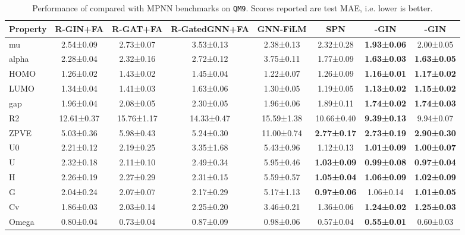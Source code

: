\documentclass{article}
\theoremstyle{plain}
\theoremstyle{definition}
\theoremstyle{remark}
\begin{document}
\begin{table*}[h]
\caption{Performance of  compared with MPNN benchmarks on \texttt{QM9}. Scores reported are test MAE, i.e. lower is better.}
\label{tab:qm9}
\begin{tabular}{@{}lccccccc@{}}
\toprule
Property & R-GIN+FA         & R-GAT+FA         & R-GatedGNN+FA    & GNN-FiLM         & SPN                      & -GIN           & -GIN    \\ \midrule
mu       & 2.54\small±0.09  & 2.73\small±0.07  & 3.53\small±0.13  & 2.38\small±0.13  & 2.32\small±0.28          & \textbf{1.93\small±0.06} & 2.00\small±0.05          \\
alpha    & 2.28\small±0.04  & 2.32\small±0.16  & 2.72\small±0.12  & 3.75\small±0.11  & 1.77\small±0.09          & \textbf{1.63\small±0.03} & \textbf{1.63\small±0.05} \\
HOMO     & 1.26\small±0.02  & 1.43\small±0.02  & 1.45\small±0.04  & 1.22\small±0.07  & 1.26\small±0.09          & \textbf{1.16\small±0.01} & \textbf{1.17\small±0.02} \\
LUMO     & 1.34\small±0.04  & 1.41\small±0.03  & 1.63\small±0.06  & 1.30\small±0.05  & 1.19\small±0.05          & \textbf{1.13\small±0.02} & \textbf{1.15\small±0.02} \\
gap      & 1.96\small±0.04  & 2.08\small±0.05  & 2.30\small±0.05  & 1.96\small±0.06  & 1.89\small±0.11          & \textbf{1.74\small±0.02} & \textbf{1.74\small±0.03} \\
R2       & 12.61\small±0.37 & 15.76\small±1.17 & 14.33\small±0.47 & 15.59\small±1.38 & 10.66\small±0.40         & \textbf{9.39\small±0.13} & 9.94\small±0.07          \\
ZPVE     & 5.03\small±0.36  & 5.98\small±0.43  & 5.24\small±0.30  & 11.00\small±0.74 & \textbf{2.77\small±0.17} & \textbf{2.73\small±0.19} & \textbf{2.90\small±0.30} \\
U0       & 2.21\small±0.12  & 2.19\small±0.25  & 3.35\small±1.68  & 5.43\small±0.96  & 1.12\small±0.13          & \textbf{1.01\small±0.09} & \textbf{1.00\small±0.07} \\
U        & 2.32\small±0.18  & 2.11\small±0.10  & 2.49\small±0.34  & 5.95\small±0.46  & \textbf{1.03\small±0.09} & \textbf{0.99\small±0.08} & \textbf{0.97\small±0.04} \\
H        & 2.26\small±0.19  & 2.27\small±0.29  & 2.31\small±0.15  & 5.59\small±0.57  & \textbf{1.05\small±0.04} & \textbf{1.06\small±0.09} & \textbf{1.02\small±0.09} \\
G        & 2.04\small±0.24  & 2.07\small±0.07  & 2.17\small±0.29  & 5.17\small±1.13  & \textbf{0.97\small±0.06} & 1.06\small±0.14          & \textbf{1.01\small±0.05} \\
Cv       & 1.86\small±0.03  & 2.03\small±0.14  & 2.25\small±0.20  & 3.46\small±0.21  & 1.36\small±0.06          & \textbf{1.24\small±0.02} & \textbf{1.25\small±0.03} \\
Omega    & 0.80\small±0.04  & 0.73\small±0.04  & 0.87\small±0.09  & 0.98\small±0.06  & 0.57\small±0.04          & \textbf{0.55\small±0.01} & 0.60\small±0.03          \\ \bottomrule
\end{tabular}
\end{table*}
\end{document}
